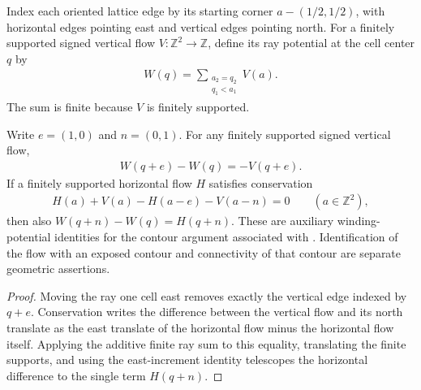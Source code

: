 

\begin{definition}%
    \label{def:peps_integer_contour_ray_potential}
    \leanok
    Index each oriented lattice edge by its starting corner
    $a-(1/2,1/2)$, with horizontal edges pointing east and vertical
    edges pointing north. For a finitely supported signed vertical
    flow $V:\mathbb Z^2\to\mathbb Z$, define its ray potential at the
    cell center $q$ by
    \begin{align}
        W(q)=\sum_{\substack{a_2=q_2 \\q_1<a_1}}V(a).
    \end{align}
    The sum is finite because $V$ is finitely supported.
\end{definition}

\begin{lemma}%
    \label{thm:peps_integer_contour_ray_potential}
    \leanok
    Write $e=(1,0)$ and $n=(0,1)$. For any finitely supported signed
    vertical flow,
    \begin{align}
        W(q+e)-W(q)=-V(q+e).
    \end{align}
    If a finitely supported horizontal flow $H$ satisfies conservation
    \begin{align}
        H(a)+V(a)-H(a-e)-V(a-n)=0
        \qquad(a\in\mathbb Z^2),
    \end{align}
    then also $W(q+n)-W(q)=H(q+n)$.
    These are auxiliary winding-potential identities for the contour
    argument associated with \cite[proof of Theorem~6.9]{Schuch2010PEPS}.
    Identification of the flow with an exposed contour and
    connectivity of that contour are separate geometric assertions.
\end{lemma}
\begin{proof}\leanok
    Moving the ray one cell east removes exactly the vertical edge
    indexed by $q+e$. Conservation writes the difference between the
    vertical flow and its north translate as the east translate of
    the horizontal flow minus the horizontal flow itself. Applying the
    additive finite ray sum to this equality, translating the
    finite supports, and using the east-increment identity telescopes the
    horizontal difference to the single term $H(q+n)$.
\end{proof}

